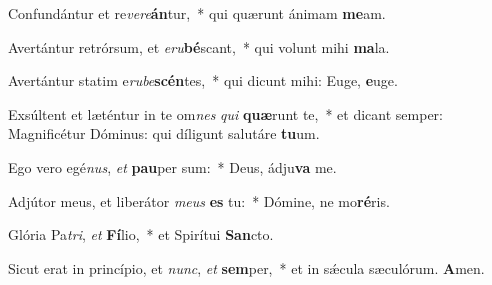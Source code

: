 \item Confundántur et re\emph{ve}\emph{re}\textbf{án}tur,~* qui quærunt ánimam \textbf{me}am.
\item Avertántur retrórsum, et \emph{e}\emph{ru}\textbf{bé}scant,~* qui volunt mihi \textbf{ma}la.
\item Avertántur statim e\emph{ru}\-\emph{be}\-\textbf{scén}\-tes,~* qui dicunt mihi: Euge, \textbf{e}uge.
\item Exsúltent et læténtur in te om\emph{nes} \emph{qui} \textbf{quæ}runt te,~* et dicant semper: Magnificétur Dóminus: qui díligunt salutáre \textbf{tu}um.
\item Ego vero egé\emph{nus}, \emph{et} \textbf{pau}per sum:~* Deus, ádju\textbf{va} me.
\item Adjútor meus, et liberátor \emph{me}\emph{us} \textbf{es} tu:~* Dómine, ne mo\textbf{ré}ris.
\item Glória Pa\emph{tri}, \emph{et} \textbf{Fí}lio,~* et Spirítui \textbf{San}cto.
\item Sicut erat in princípio, et \emph{nunc}, \emph{et} \textbf{sem}per,~* et in sǽcula sæculórum. \textbf{A}men.